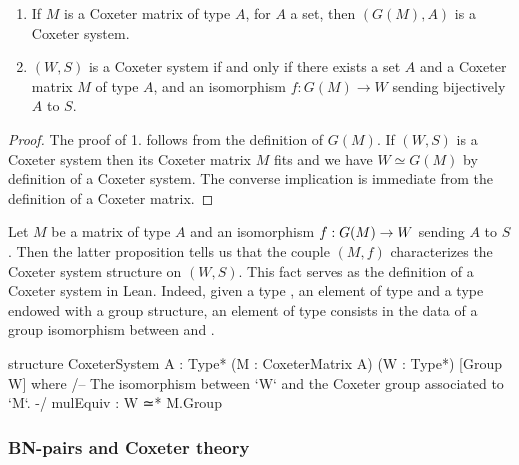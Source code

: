 \begin{propriete}

\begin{enumerate}
    \item If $M$ is a Coxeter matrix of type $A$, for $A$ a set, then $\left( G\left( M \right),A \right)$ is a Coxeter system.
    \item $\left( W,S \right)$ is a Coxeter system if and only if there exists a set $A$ and a Coxeter matrix $M$ of type $A$, and an isomorphism $f : G\left( M \right) \to W$ sending bijectively $A$ to $S$. 
\end{enumerate}
\end{propriete}
   
\begin{proof}

The proof of 1. follows from the definition of $G\left( M \right)$.
If $\left( W,S \right)$ is a Coxeter system then its Coxeter matrix $M$ fits and we have $ W \simeq G(M)$ by definition of a Coxeter system. The converse implication is immediate from the definition of a Coxeter matrix.

\end{proof}
Let $M$ be a matrix of type $A$ and an isomorphism $f : G(M) \to W$ sending $A$ to $S$. Then the latter proposition tells us that the couple $\left( M,f \right)$ characterizes the Coxeter system structure on $\left( W,S \right)$. This fact serves as the definition of a Coxeter system in Lean. 
Indeed, given a type , an element  of type  and a type  endowed with a group structure, an element of type  consists in the data of a group isomorphism between  and .

\begin{leancode}
structure CoxeterSystem {A : Type*} (M : CoxeterMatrix A) (W : Type*) 
    [Group W] where
  /-- The isomorphism between `W` and the Coxeter group associated to `M`. -/
  mulEquiv : W ≃* M.Group
\end{leancode}


\subsubsection{BN-pairs and Coxeter theory}
\label{subsub:Coxeter2} 

